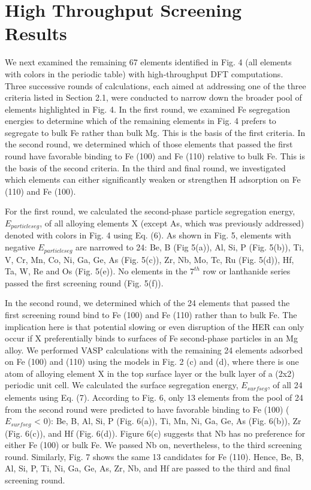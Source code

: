 \section{High Throughput Screening Results}

We next examined the remaining 67 elements identified in Fig. 4 (all elements with colors in the periodic table) with high-throughput DFT computations. Three successive rounds of calculations, each aimed at addressing one of the three criteria listed in Section 2.1, were conducted to narrow down the broader pool of elements highlighted in Fig. 4. In the first round, we examined Fe segregation energies to determine which of the remaining elements in Fig. 4 prefers to segregate to bulk Fe rather than bulk Mg. This is the basis of the first criteria. In the second round, we determined which of those elements that passed the first round have favorable binding to Fe (100) and Fe (110) relative to bulk Fe. This is the basis of the second criteria. In the third and final round, we investigated which elements can either significantly weaken or strengthen H adsorption on Fe (110) and Fe (100).

For the first round, we calculated the second-phase particle segregation energy, $E_{particle seg}$,  of all alloying elements X (except As, which was previously addressed) denoted with colors in Fig. 4 using Eq. (6). As shown in Fig. 5, elements with negative $E_{particle seg}$ are narrowed to 24: Be, B (Fig 5(a)), Al, Si, P (Fig. 5(b)), Ti, V, Cr, Mn, Co, Ni, Ga, Ge, As (Fig. 5(c)), Zr, Nb, Mo, Tc, Ru (Fig. 5(d)), Hf, Ta, W, Re and Os (Fig. 5(e)). No elements in the $7^{th}$ row or lanthanide series passed the first screening round (Fig. 5(f)).

In the second round, we determined which of the 24 elements that passed the first screening round bind to Fe (100) and Fe (110) rather than to bulk Fe. The implication here is that potential slowing or even disruption of the HER can only occur if X preferentially binds to surfaces of Fe second-phase particles in an Mg alloy. We performed \ac{VASP} calculations with the remaining 24 elements adsorbed on Fe (100) and (110) using the models in Fig. 2 (c) and (d), where there is one atom of alloying element X in the top surface layer or the bulk layer of a (2x2) periodic unit cell. We calculated the surface segregation energy, $E_{surf seg}$, of all 24 elements using Eq. (7). According to Fig. 6, only 13 elements from the pool of 24 from the second round were predicted to have favorable binding to Fe (100) ($E_{surf seg}$ < 0): Be, B, Al, Si, P (Fig. 6(a)), Ti, Mn, Ni, Ga, Ge, As (Fig. 6(b)), Zr (Fig. 6(c)), and Hf (Fig. 6(d)). Figure 6(c) suggests that Nb has no preference for either Fe (100) or bulk Fe. We passed Nb on, nevertheless, to the third screening round. Similarly, Fig. 7 shows the same 13 candidates for Fe (110).  Hence, Be, B, Al, Si, P, Ti, Ni, Ga, Ge, As, Zr, Nb, and Hf are passed to the third and final screening round.

